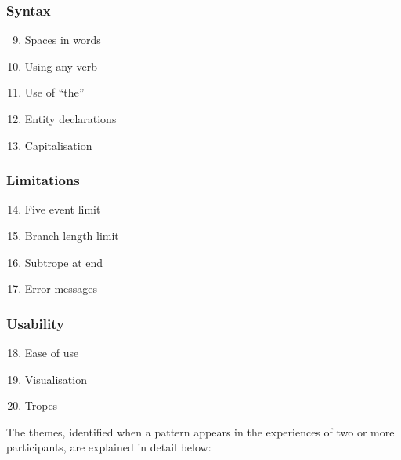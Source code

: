 \documentclass[11pt]{report}
\begin{document}
\subsubsection{Syntax}
\begin{enumerate}
\setcounter{enumi}{8}
\item {Spaces in words}
\item {Using any verb}
\item {Use of ``the''}
\item {Entity declarations}
\item {Capitalisation}
\end{enumerate}

\subsubsection{Limitations}
\begin{enumerate}
\setcounter{enumi}{13}
\item {Five event limit}
\item {Branch length limit}
\item {Subtrope at end}
\item {Error messages}
\end{enumerate}

\subsubsection{Usability}
\begin{enumerate}
\setcounter{enumi}{17}
\item {Ease of use}
\item {Visualisation}
\item {Tropes}
\end{enumerate}

The themes, identified when a pattern appears in the experiences of two or more
participants, are explained in detail below:
\end{document}
